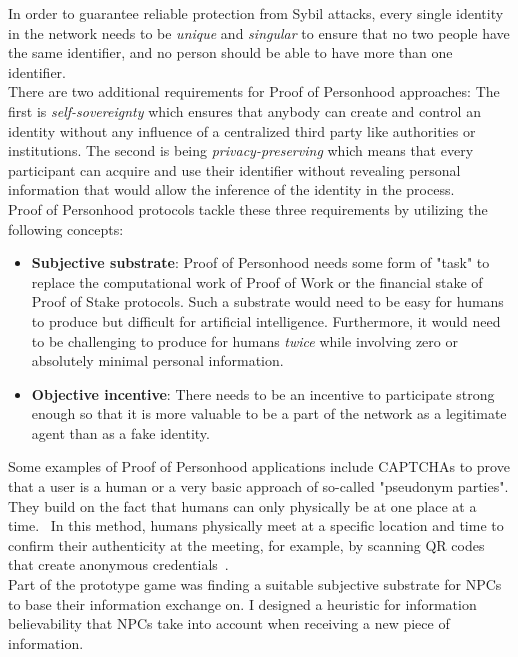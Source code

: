 In order to guarantee reliable protection from Sybil attacks, every single identity in the network needs to be \textit{unique} and \textit{singular} to ensure that no two people have the same identifier, and no person should be able to have more than one identifier.\\
There are two additional requirements for Proof of Personhood approaches: The first is \textit{self-sovereignty} which ensures that anybody can create and control an identity without any influence of a centralized third party like authorities or institutions. The second is being \textit{privacy-preserving} which means that every participant can acquire and use their identifier without revealing personal information that would allow the inference of the identity in the process.\\
Proof of Personhood protocols tackle these three requirements by utilizing the following concepts:
\begin{itemize}
	\item \textbf{Subjective substrate}: Proof of Personhood needs some form of "task" to replace the computational work of Proof of Work or the financial stake of Proof of Stake protocols. Such a substrate would need to be easy for humans to produce but difficult for artificial intelligence. Furthermore, it would need to be challenging to produce for humans \textit{twice} while involving zero or absolutely minimal personal information.
	\item \textbf{Objective incentive}: There needs to be an incentive to participate strong enough so that it is more valuable to be a part of the network as a legitimate agent than as a fake identity.
\end{itemize}
Some examples of Proof of Personhood applications include CAPTCHAs to prove that a user is a human or a very basic approach of so-called "pseudonym parties". They build on the fact that humans can only physically be at one place at a time.~\cite{Siddarth2020} In this method, humans physically meet at a specific location and time to confirm their authenticity at the meeting, for example, by scanning QR codes that create anonymous credentials~\cite{Borge2017}.\\
Part of the prototype game was finding a suitable subjective substrate for NPCs to base their information exchange on. I designed a heuristic for information believability that NPCs take into account when receiving a new piece of information.
